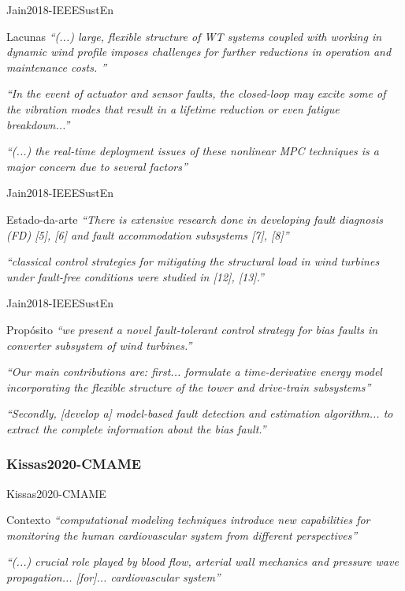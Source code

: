 \begin{frame}{Jain2018-IEEESustEn} 
\begin{block}{Lacunas}
\emph{``(...) large, flexible structure of WT systems coupled with working in dynamic wind profile imposes challenges for further reductions in operation and maintenance costs. ''}

\emph{``In the event of actuator and sensor faults, the closed-loop may excite some of the vibration modes that result in a lifetime reduction or even fatigue breakdown...''}

\emph{``(...) the real-time deployment issues of these nonlinear MPC techniques is a major concern due to several factors''}
\end{block}
\end{frame}

\begin{frame}{Jain2018-IEEESustEn} 
\begin{block}{Estado-da-arte}
\emph{``There is extensive research done in developing fault diagnosis (FD) [5], [6] and fault accommodation subsystems [7], [8]''}

\emph{``classical control strategies for mitigating the structural load in wind turbines under fault-free conditions were studied in [12], [13].''}
\end{block}
\end{frame}

\begin{frame}{Jain2018-IEEESustEn} 
\begin{block}{Propósito}
\emph{``we present a novel fault-tolerant control strategy for bias faults in converter subsystem of wind turbines.''}

\emph{``Our main contributions are: first... formulate a time-derivative energy model incorporating the flexible structure of the tower and drive-train subsystems''}

\emph{``Secondly, [develop a] model-based fault detection and estimation algorithm... to extract the complete information about the bias fault.''}
\end{block}
\end{frame}

\subsubsection*{Kissas2020-CMAME}

\begin{frame}{Kissas2020-CMAME} 
\begin{block}{Contexto}
\emph{``computational  modeling  techniques  introduce  new  capabilities for  monitoring  the  human cardiovascular system  from  different  perspectives''}
  
\emph{``(...) crucial role played by blood flow, arterial wall mechanics and pressure wave propagation... [for]... cardiovascular system''}   
 \end{block}
\end{frame}

